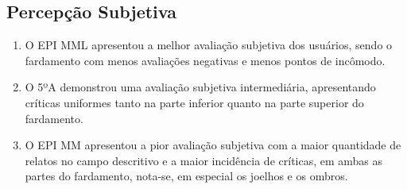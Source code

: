         \subsection{Percepção Subjetiva}
            \begin{enumerate}[label=\Roman*.] %
                \item O \acrshort{EPI} \acrlong{MML} apresentou a melhor avaliação subjetiva dos usuários, 
                sendo o fardamento com menos avaliações negativas e menos pontos de incômodo.
                \item O 5ºA demonstrou uma avaliação subjetiva intermediária, apresentando críticas 
                uniformes tanto na parte inferior quanto na parte superior do fardamento.
                \item O \acrshort{EPI} \acrlong{MM} apresentou a pior avaliação subjetiva 
                com a maior quantidade de relatos no campo descritivo e a maior incidência de críticas, 
                em ambas as partes do fardamento, nota-se, em especial os joelhos e os ombros.
                \end{enumerate}
